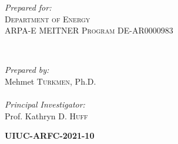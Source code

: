 \begin{titlepage}
    \vspace{0.2cm}
    \HRule
    \vspace{0.5cm}

       \begin{minipage}{0.4\textwidth}
               \begin{flushleft}
                       \large
                       \textit{Prepared for:}\\
                       \textsc{Department of Energy}\\ %
                        \textsc{ARPA-E MEITNER Program}
                        DE-AR0000983\\ %
                \end{flushleft}
       \end{minipage}
       ~
       \begin{minipage}{0.4\textwidth}
               \begin{flushright}
                       \large
                       \textit{Prepared by:}\\
                       Mehmet \textsc{Turkmen}, Ph.D.\\ %
                        \textsc{} %
                       \vspace{4mm}\\
                       \textit{Principal Investigator:}\\ %
                       Prof. Kathryn D. \textsc{Huff} %
               \end{flushright}
    \end{minipage}


    \vspace{1cm}
    \textsc{\LARGE\bfseries UIUC-ARFC-2021-10} %
    \vspace{0.5cm}



\end{titlepage}
